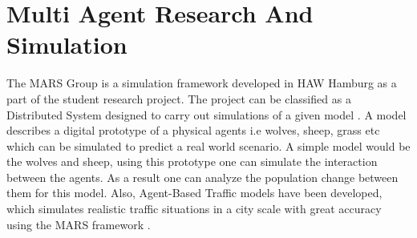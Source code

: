 
\section{Multi Agent Research And Simulation}
        \label{section:MARS}
        The MARS Group is a simulation framework developed 
        in HAW Hamburg as a  part of the student research project. The project can be classified as a
        Distributed System \cite{DistributedSystems} designed to carry out simulations of a given model 
        \cite{HAWHamburgMARS}. 
        A model describes a digital prototype of a physical agents i.e wolves, sheep, grass etc 
        which can be simulated to predict a real world scenario. A simple model would
        be the wolves and sheep, using this prototype one can simulate the interaction between the agents. 
        As a result one can analyze the population change between them for this model. Also, Agent-Based Traffic
        models have been developed, which simulates realistic traffic situations in a city scale with great accuracy 
        using the MARS framework \cite{TrafficModel}.

        \par
